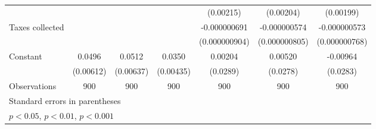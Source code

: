 {\begin{tabular}{l*{6}{c}}
                    &                     &                     &                     &   (0.00215)         &   (0.00204)         &   (0.00199)         \\
[1em]
Taxes collected     &                     &                     &                     &-0.000000691         &-0.000000574         &-0.000000573         \\
                    &                     &                     &                     &(0.000000904)         &(0.000000805)         &(0.000000768)         \\
[1em]
Constant            &      0.0496\sym{***}&      0.0512\sym{***}&      0.0350\sym{***}&     0.00204         &     0.00520         &    -0.00964         \\
                    &   (0.00612)         &   (0.00637)         &   (0.00435)         &    (0.0289)         &    (0.0278)         &    (0.0283)         \\
\hline
Observations        &         900         &         900         &         900         &         900         &         900         &         900         \\
\hline\hline
\multicolumn{7}{l}{\footnotesize Standard errors in parentheses}\\
\multicolumn{7}{l}{\footnotesize \sym{*} \(p<0.05\), \sym{**} \(p<0.01\), \sym{***} \(p<0.001\)}\\
\end{tabular}
}
